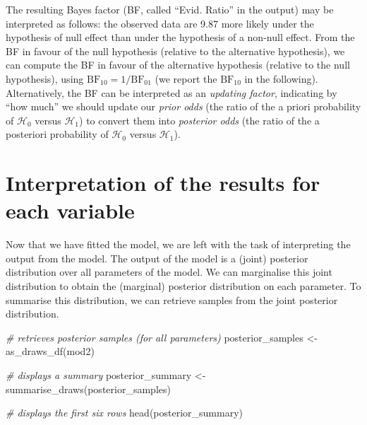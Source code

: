 \documentclass[
  11pt,
  english,
  ,doc,floatsintext]{apa6}
\newenvironment{Shaded}{}{}
\newcommand{\CommentTok}[1]{\textcolor[rgb]{0.38,0.63,0.69}{\textit{#1}}}
\newcommand{\FunctionTok}[1]{\textcolor[rgb]{0.02,0.16,0.49}{#1}}
\newcommand{\NormalTok}[1]{#1}
\newcommand{\OtherTok}[1]{\textcolor[rgb]{0.00,0.44,0.13}{#1}}
\begin{document}
The resulting Bayes factor (BF, called ``Evid. Ratio'' in the output) may be interpreted as follows: the observed data are 9.87 more likely under the hypothesis of null effect than under the hypothesis of a non-null effect. From the BF in favour of the null hypothesis (relative to the alternative hypothesis), we can compute the BF in favour of the alternative hypothesis (relative to the null hypothesis), using \(\text{BF}_{10} = 1 / \text{BF}_{01}\) (we report the \(\text{BF}_{10}\) in the following). Alternatively, the BF can be interpreted as an \emph{updating factor}, indicating by ``how much'' we should update our \emph{prior odds} (the ratio of the a priori probability of \(\mathcal{H}_{0}\) versus \(\mathcal{H}_{1}\)) to convert them into \emph{posterior odds} (the ratio of the a posteriori probability of \(\mathcal{H}_{0}\) versus \(\mathcal{H}_{1}\)).

\newpage

\hypertarget{interpretation-of-the-results-for-each-variable}{%
\section{Interpretation of the results for each variable}\label{interpretation-of-the-results-for-each-variable}}

Now that we have fitted the model, we are left with the task of interpreting the output from the model. The output of the model is a (joint) posterior distribution over all parameters of the model. We can marginalise this joint distribution to obtain the (marginal) posterior distribution on each parameter. To summarise this distribution, we can retrieve samples from the joint posterior distribution.

\begin{Shaded}
\begin{Highlighting}[]
\CommentTok{\# retrieves posterior samples (for all parameters)}
\NormalTok{posterior\_samples }\OtherTok{\textless{}{-}} \FunctionTok{as\_draws\_df}\NormalTok{(mod2)}

\CommentTok{\# displays a summary}
\NormalTok{posterior\_summary }\OtherTok{\textless{}{-}} \FunctionTok{summarise\_draws}\NormalTok{(posterior\_samples)}

\CommentTok{\# displays the first six rows}
\FunctionTok{head}\NormalTok{(posterior\_summary)}
\end{Highlighting}
\end{Shaded}
\end{document}
